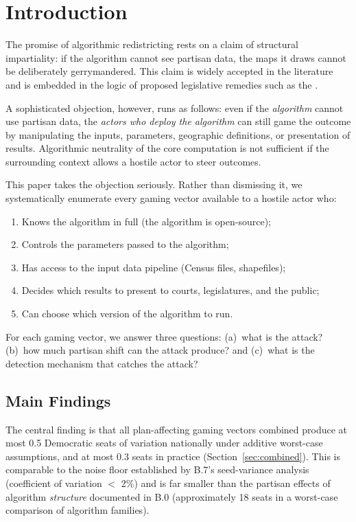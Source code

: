 \section{Introduction}
\label{sec:introduction}

The promise of algorithmic redistricting rests on a claim of structural
impartiality: if the algorithm cannot see partisan data, the maps it draws
cannot be deliberately gerrymandered.
This claim is widely accepted in the literature~\citep{chen2013unintentional,
browdy1990computer, altman2011bard} and is embedded in the logic of proposed
legislative remedies such as the \dia{}.

A sophisticated objection, however, runs as follows: even if the \emph{algorithm}
cannot use partisan data, the \emph{actors who deploy the algorithm} can still
game the outcome by manipulating the inputs, parameters, geographic definitions,
or presentation of results.
Algorithmic neutrality of the core computation is not sufficient if the surrounding
context allows a hostile actor to steer outcomes.

This paper takes the objection seriously.
Rather than dismissing it, we systematically enumerate every gaming vector
available to a hostile actor who:
\begin{enumerate}
\item Knows the \bisect{} algorithm in full (the algorithm is open-source);
\item Controls the parameters passed to the algorithm;
\item Has access to the input data pipeline (Census files, shapefiles);
\item Decides which results to present to courts, legislatures, and the public;
\item Can choose which version of the algorithm to run.
\end{enumerate}

For each gaming vector, we answer three questions: (a)~what is the attack?
(b)~how much partisan shift can the attack produce? and (c)~what is the
detection mechanism that catches the attack?

\subsection{Main Findings}

The central finding is that all plan-affecting gaming vectors combined produce
at most 0.5 Democratic seats of variation nationally under additive worst-case
assumptions, and at most 0.3 seats in practice (Section~\ref{sec:combined}).
This is comparable to the noise floor established by B.7's seed-variance analysis
(coefficient of variation $<$ 2\%) and is far smaller than the partisan
effects of algorithm \emph{structure} documented in B.0 (approximately
18 seats in a worst-case comparison of algorithm families).

